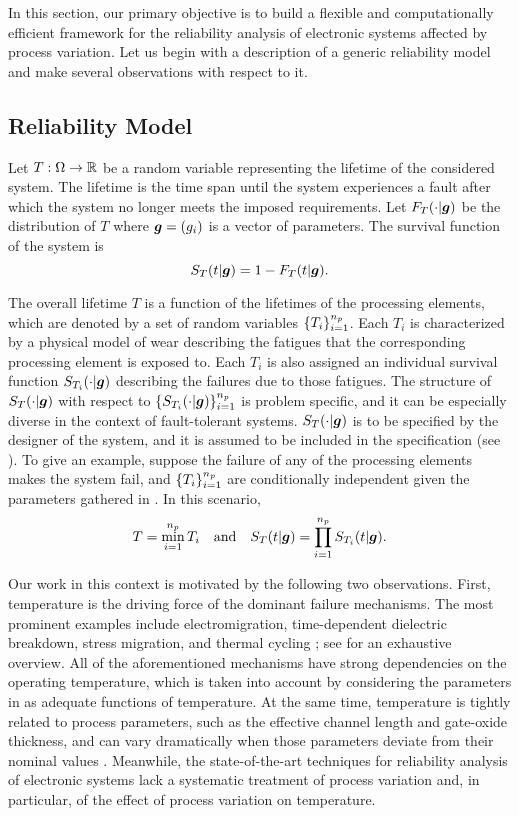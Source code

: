 In this section, our primary objective is to build a flexible and
computationally efficient framework for the reliability analysis of electronic
systems affected by process variation. Let us begin with a description of a
generic reliability model and make several observations with respect to it.

\subsection{Reliability Model}

Let $T: \Omega \to \mathbb{R}$ be a random variable representing the lifetime of the
considered system. The lifetime is the time span until the system experiences a
fault after which the system no longer meets the imposed requirements. Let
$F_T(\cdot | \boldsymbol{g})$ be the distribution of $T$ where $\boldsymbol{g} = (g_i)$ is a vector
of parameters. The survival function of the system is
\[
  S_T(t | \boldsymbol{g}) = 1 - F_T(t | \boldsymbol{g}).
\]

The overall lifetime $T$ is a function of the lifetimes of the processing
elements, which are denoted by a set of random variables $\{ T_i \}_{i =
1}^{n_{p}}$. Each $T_i$ is characterized by a physical model of wear
\cite{jedec2016} describing the fatigues that the corresponding processing
element is exposed to. Each $T_i$ is also assigned an individual survival
function $S_{T_i}(\cdot | \boldsymbol{g})$ describing the failures due to those fatigues.
The structure of $S_T(\cdot | \boldsymbol{g})$ with respect to $\{ S_{T_i}(\cdot | \boldsymbol{g})
\}_{i = 1}^{n_{p}}$ is problem specific, and it can be especially diverse in the
context of fault-tolerant systems. $S_T(\cdot | \boldsymbol{g})$ is to be specified by the
designer of the system, and it is assumed to be included in the specification
\spec (see ). To give an example, suppose the failure
of any of the \np processing elements makes the system fail, and $\{ T_i \}_{i =
1}^{n_{p}}$ are conditionally independent given the parameters gathered in \vg. In
this scenario,
\[
  T = \min_{i = 1}^{n_{p}} T_i \hspace{1em} \text{and} \hspace{1em}
  S_T(t | \boldsymbol{g}) = \prod_{i = 1}^{n_{p}} S_{T_i}(t | \boldsymbol{g}).
\]

Our work in this context is motivated by the following two observations. First,
temperature is the driving force of the dominant failure mechanisms. The most
prominent examples include electromigration, time-dependent dielectric
breakdown, stress migration, and thermal cycling \cite{xiang2010}; see
\cite{jedec} for an exhaustive overview. All of the aforementioned mechanisms
have strong dependencies on the operating temperature, which is taken into
account by considering the parameters in \vg as adequate functions of
temperature. At the same time, temperature is tightly related to process
parameters, such as the effective channel length and gate-oxide thickness, and
can vary dramatically when those parameters deviate from their nominal values
\cite{ukhov2014, juan2012}. Meanwhile, the state-of-the-art techniques for
reliability analysis of electronic systems lack a systematic treatment of
process variation and, in particular, of the effect of process variation on
temperature.

